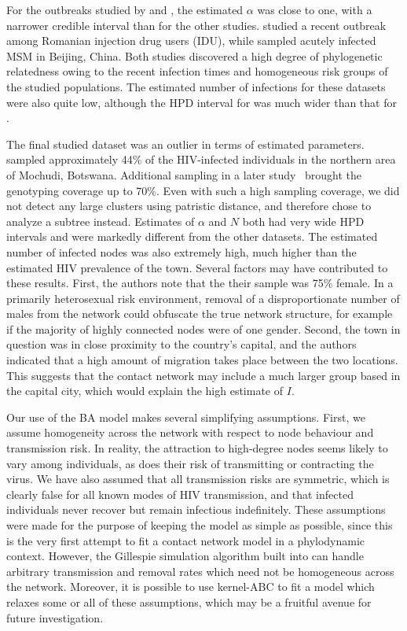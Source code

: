 For the outbreaks studied by \textcite{niculescu2015recent} and
\textcite{wang2015targeting}, the estimated $\alpha$ was close to one, with a
narrower credible interval than for the other studies.
\citeauthor{niculescu2015recent} studied a recent outbreak among Romanian
injection drug users (IDU), while \citeauthor{wang2015targeting} sampled
acutely infected MSM in Beijing, China. Both studies discovered a high degree
of phylogenetic relatedness owing to the recent infection times and homogeneous
risk groups of the studied populations. The estimated number of infections for
these datasets were also quite low, although the HPD interval for
\citeauthor{wang2015targeting} was much wider than that for
\citeauthor{niculescu2015recent}.

The final studied dataset was an outlier in terms of estimated parameters.
\textcite{novitsky2013phylogenetic} sampled approximately 44\% of the
HIV-infected individuals in the northern area of Mochudi, Botswana. Additional
sampling in a later study~\autocite{novitsky2014impact} brought the genotyping
coverage up to 70\%. Even with such a high sampling coverage, we did not detect
any large clusters using patristic distance, and therefore chose to analyze a
subtree instead. Estimates of $\alpha$ and $N$ both had very wide HPD intervals
and were markedly different from the other datasets. The estimated number of
infected nodes was also extremely high, much higher than the estimated HIV
prevalence of the town. Several factors may have contributed to these results.
First, the authors note that the their sample was 75\% female.  In a primarily
heterosexual risk environment, removal of a disproportionate number of males
from the network could obfuscate the true network structure, for example if the
majority of highly connected nodes were of one gender.  Second, the town in
question was in close proximity to the country's capital, and the authors
indicated that a high amount of migration takes place between the two
locations. This suggests that the contact network may include a much larger
group based in the capital city, which would explain the high estimate of $I$.

Our use of the \gls{BA} model makes several simplifying assumptions. First, we
assume homogeneity across the network with respect to node behaviour and
transmission risk. In reality, the attraction to high-degree nodes seems likely
to vary among individuals, as does their risk of transmitting or contracting
the virus. We have also assumed that all transmission risks are symmetric,
which is clearly false for all known modes of \gls{HIV} transmission, and that
infected individuals never recover but remain infectious indefinitely. These
assumptions were made for the purpose of keeping the model as simple as
possible, since this is the very first attempt to fit a contact network model
in a phylodynamic context. However, the Gillespie simulation algorithm built
into  can handle arbitrary transmission and removal rates
which need not be homogeneous across the network. Moreover, it is possible to
use kernel-\gls{ABC} to fit a model which relaxes some or all of these
assumptions, which may be a fruitful avenue for future investigation.
